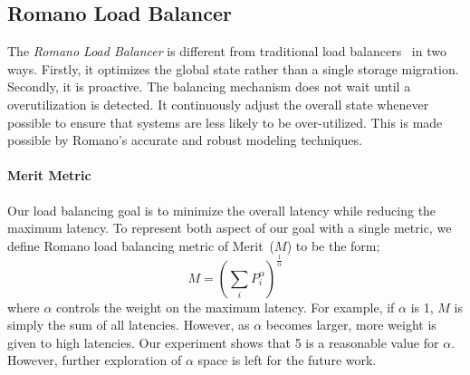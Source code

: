 \subsection{Romano Load Balancer}
The \emph{Romano Load Balancer} is different from traditional load balancers~\cite{gulati:2010, gulati:2011, singh:2008} in two ways.
Firstly, it optimizes the global state rather than a single storage migration.
Secondly, it is proactive.
The balancing mechanism does not wait until a overutilization is detected.
It continuously adjust the overall state whenever possible to ensure that systems are less likely to be over-utilized.
This is made possible by Romano's accurate and robust modeling techniques.

\paragraph{Merit Metric}
Our load balancing goal is to minimize the overall latency while reducing the maximum latency.
To represent both aspect of our goal with a single metric, we define Romano load balancing metric of Merit~($M$) to be the form;
\begin{equation}\label{merit}
M=\left(\sum_iP_i^\alpha\right)^\frac{1}{\alpha}
\end{equation}
where $\alpha$ controls the weight on the maximum latency.
For example, if $\alpha$ is 1, $M$ is simply the sum of all latencies.
However, as $\alpha$ becomes larger, more weight is given to high latencies.
Our experiment shows that 5 is a reasonable value for $\alpha$.
However, further exploration of $\alpha$ space is left for the future work.


